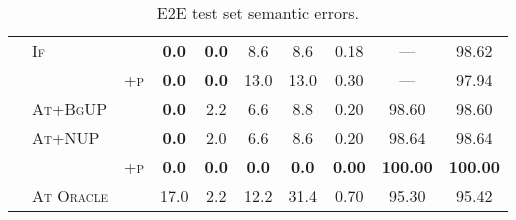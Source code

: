 \begin{table*}[t!]
\begin{tabular}{lll c c c c  c c c}
&\textsc{If} & &\textbf{  0.0}&\textbf{  0.0}&8.6&8.6&0.18&---&98.62 \\
&  & \textsc{+p}&\textbf{  0.0}&\textbf{  0.0}&13.0&13.0&0.30&---&97.94 \\
&\textsc{At+BgUP} & &\textbf{  0.0}&2.2&6.6&8.8&0.20&98.60&98.60 \\
&\textsc{At+NUP} & &\textbf{  0.0}&2.0&6.6&8.6&0.20&98.64&98.64 \\
&  & \textsc{+p}&\textbf{  0.0}&\textbf{  0.0}&\textbf{  0.0}&\textbf{  0.0}&\textbf{ 0.00}&\textbf{100.00}&\textbf{100.00} \\
&\textsc{At Oracle} & &17.0&2.2&12.2&31.4&0.70&95.30&95.42 \\
\midrule
\end{tabular}


\caption{E2E test set semantic errors.}
\label{app:e2e.sem}
\end{table*}
